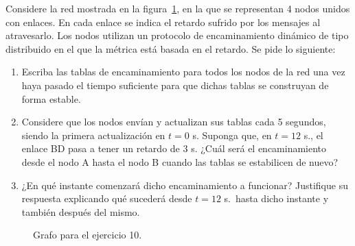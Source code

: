 \begin{ejercicio}
    Considere la red mostrada en la figura~\ref{grafo:ej10}, en la que se representan 4 nodos unidos con enlaces. En cada enlace se indica el retardo sufrido por los mensajes al atravesarlo. Los nodos utilizan un protocolo de encaminamiento dinámico de tipo distribuido en el que la métrica está basada en el retardo. Se pide lo siguiente:
    \begin{enumerate}[label=\alph*.]
        \item Escriba las tablas de encaminamiento para todos los nodos de la red una vez haya pasado el tiempo suficiente para que dichas tablas se construyan de forma estable.
        \item Considere que los nodos envían y actualizan sus tablas cada 5 segundos, siendo la primera actualización en $t=0$ s. Suponga que, en $t=12$ s., el enlace BD pasa a tener un retardo de 3 s. ¿Cuál será el encaminamiento desde el nodo A hasta el nodo B cuando las tablas se estabilicen de nuevo?
        \item ¿En qué instante comenzará dicho encaminamiento a funcionar? Justifique su respuesta explicando qué sucederá desde $t=12$ s.\ hasta dicho instante y también después del mismo.
    \end{enumerate}

    \begin{figure}[H]
    \centering
    \caption{Grafo para el ejercicio 10.}
    \label{grafo:ej10}
    \end{figure}
\end{ejercicio}

